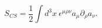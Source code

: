 \begin{equation}
  S_{CS} = \frac{1}{2} \int d^3 x~ \epsilon^{\mu \rho\nu}
           a_\mu \partial_\rho a_\nu.
\end{equation}

